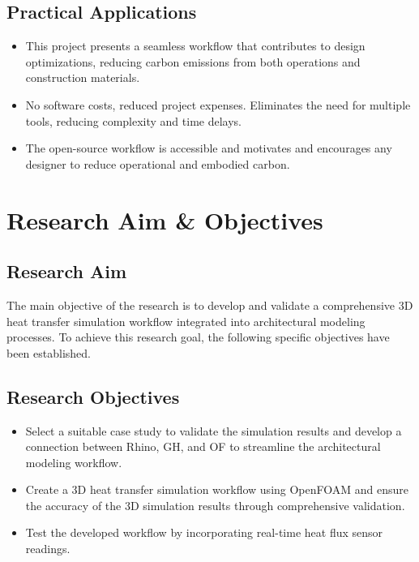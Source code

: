 \subsection{Practical Applications}
\begin{itemize}
\item This project presents a seamless workflow that contributes to design optimizations, reducing carbon emissions from both operations and construction materials.
\item No software costs, reduced project expenses. Eliminates the need for multiple tools, reducing complexity and time delays.
\item The open-source workflow is accessible and motivates and encourages any designer to reduce operational and embodied carbon.



\end{itemize}
\section{Research Aim \& Objectives}
\subsection{Research Aim}
The main objective of the research is to develop and validate a comprehensive 3D heat transfer simulation workflow integrated into architectural modeling processes. To achieve this research goal, the following specific objectives have been established.

\subsection{Research Objectives}
\begin{itemize}
    \item Select a suitable case study to validate the simulation results and develop a connection between Rhino, \gls{GH}, and \gls{OF} to streamline the architectural modeling workflow. 
    \item  Create a 3D heat transfer simulation workflow using OpenFOAM and ensure the accuracy of the 3D simulation results through comprehensive validation.
    \item Test the developed workflow by incorporating real-time heat flux sensor readings.
 
\end{itemize}







